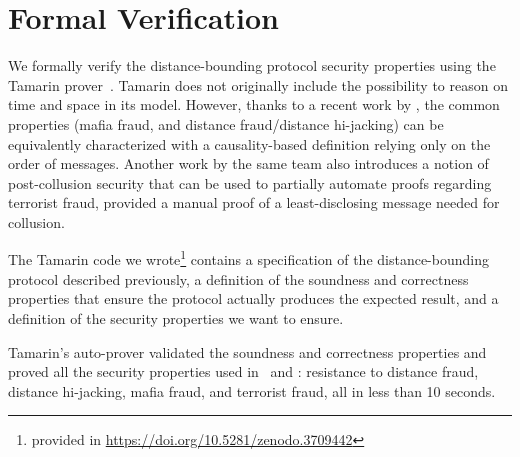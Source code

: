 \section{Formal Verification}\label{formal-verification}

We formally verify the distance-bounding protocol security properties using the Tamarin
prover~\cite{meier2013tamarin}. Tamarin does not originally include
the possibility to reason on time and space in its model.  However,
thanks to a recent work by \textcite{TamarinDB}, the common properties
(mafia fraud, and distance fraud/distance hi-jacking) can be equivalently 
characterized with a causality-based definition relying only on the order
of messages.
Another work by the same team \textcite{TamarinDBTF} also introduces a
notion of post-collusion security that can be used to partially automate
proofs regarding terrorist fraud, provided a manual proof of a least-disclosing
message needed for collusion.


The Tamarin code we wrote\footnote{provided in \url{https://doi.org/10.5281/zenodo.3709442}}%
 contains a specification of the distance-bounding protocol described previously, a definition 
 of the soundness and correctness properties that ensure the protocol actually produces the
 expected result, and a definition of the security properties we want to ensure.

Tamarin's auto-prover validated the soundness and correctness
properties and proved all the security
properties used in~\cite{TamarinDB} and \textcite{TamarinDBTF}: resistance to distance fraud, distance hi-jacking, mafia fraud, and terrorist fraud, all in less than 10 seconds.


